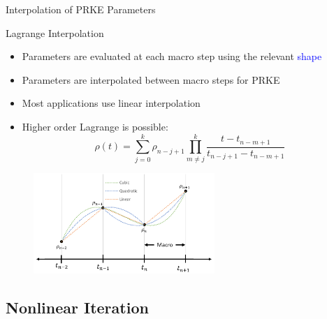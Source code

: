 \documentclass[8pt,xcolor=dvipnames]{beamer}
\newcommand{\be}{\begin{equation*}}
\newcommand{\ee}{\end{equation*}}
\newcommand{\tcb}[1]{\textcolor{blue}{#1}}
\begin{document}
\begin{frame}{Interpolation of PRKE Parameters}

\begin{block}{Lagrange Interpolation}
\begin{itemize}
\item Parameters are evaluated at each macro step using the relevant \tcb{shape}
\item Parameters are interpolated between macro steps for PRKE
\item Most applications use linear interpolation
\item Higher order Lagrange is possible:
\be
\rho(t) = \sum_{j=0}^k \rho_{n-j+1} \prod_{m\neq j}^k \frac{t-t_{n-m+1}}{t_{n-j+1}-t_{n-m+1}}
\ee
\end{itemize}
\end{block}

\begin{figure}
\includegraphics[height=1.5in]{figures/param_interp.png}
\end{figure}

\end{frame}

\subsection{Nonlinear Iteration}
\end{document}
